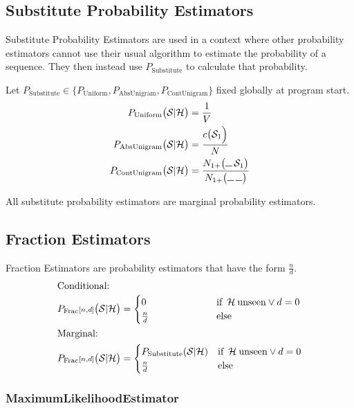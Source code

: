 \documentclass[11pt,a4paper]{article}
\newcommand{\Seq}{\mathcal{S}}
\newcommand{\Hist}{\mathcal{H}}
\newcommand{\Skp}{\rule{7pt}{.5pt}}
\begin{document}
  \subsection{Substitute Probability Estimators}

  Substitute Probability Estimators are used in a context where other
  probability estimators cannot use their usual algorithm to estimate the
  probability of a sequence. They then instead use $P_\mathrm{Substitute}$ to
  calculate that probability.

  Let $P_\mathrm{Substitute} \in \big\{ P_\mathrm{Uniform} , P_\mathrm{AbsUnigram} , P_\mathrm{ContUnigram}\big\}$
  fixed globally at program start.
  \begin{align}
    P_\mathrm{Uniform}\big(\Seq | \Hist\big) &= \frac{1}{V} \\
    P_\mathrm{AbsUnigram}\big(\Seq | \Hist\big) &= \frac{c\big(\Seq_1\Big)}{N} \\
    P_\mathrm{ContUnigram}\big(\Seq | \Hist\big) &= \frac{N_{1+}\big(\Skp \, \Seq_1\big)}{N_{1+}\big(\Skp \, \Skp\big)}
  \end{align}

  All substitute probability estimators are marginal probability estimators.

  \subsection{Fraction Estimators}

  Fraction Estimators are probability estimators that have the form $\frac{n}{d}$.
  \begin{alignat}{2}
    \intertext{Conditional:}
    P_\mathrm{Frac}{\scriptstyle[n , d]}\big(\Seq | \Hist\big) &= \begin{cases}
      0\hphantom{_\mathrm{Substitute}(\Seq | \Hist)} & \text{if} \enspace \Hist \: \mathrm{unseen} \lor d = 0 \\
      \frac{n}{d} & \text{else}
    \end{cases} \\
    \intertext{Marginal:}
    P_\mathrm{Frac}{\scriptstyle[n , d]}\big(\Seq | \Hist\big) &= \begin{cases}
      P_\mathrm{Substitute}(\Seq | \Hist) & \text{if} \enspace \Hist \: \mathrm{unseen} \lor d = 0 \\
      \frac{n}{d} & \text{else}
    \end{cases}
  \end{alignat}

  \subsubsection{MaximumLikelihoodEstimator}
\end{document}
